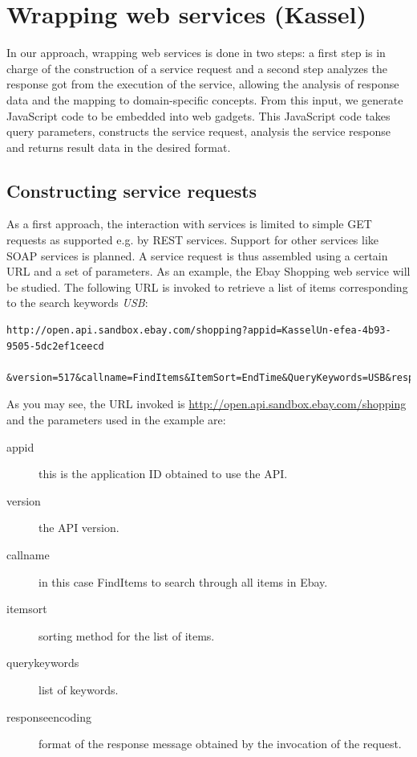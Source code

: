 
\section{Wrapping web services (Kassel)}
\label{sec:wrapping_web_services}

In our approach, wrapping web services is done in two steps: a first step is in charge of the construction of a service request and a second step analyzes the response got from the execution of the service, allowing the analysis of response data and the mapping to domain-specific concepts. From this input, we generate JavaScript code to be embedded into web gadgets. This JavaScript code takes query parameters, constructs the service request, analysis the service response and returns result data in the desired format. 

\subsection{Constructing service requests} %
\label{sub:constructing_service_requests}

As a first approach, the interaction with services is limited to simple GET requests as supported e.g. by REST services. Support for other services like SOAP services is planned. A service request is thus assembled using a certain URL and a set of parameters. As an example, the Ebay Shopping web service will be studied. The following URL is invoked to retrieve a list of items corresponding to the search keywords \emph{USB}:

\begin{listing}
\begin{verbatim}
http://open.api.sandbox.ebay.com/shopping?appid=KasselUn-efea-4b93-9505-5dc2ef1ceecd
  &version=517&callname=FindItems&ItemSort=EndTime&QueryKeywords=USB&responseencoding=XML
\end{verbatim}
\end{listing}

As you may see, the URL invoked is \url{http://open.api.sandbox.ebay.com/shopping} and the parameters used in the example are:
\begin{description}
	\item[appid] this is the application ID obtained to use the API.
	\item[version] the API version.
	\item[callname] in this case FindItems to search through all items in Ebay.
	\item[itemsort] sorting method for the list of items.
	\item[querykeywords] list of keywords.
	\item[responseencoding] format of the response message obtained by the invocation of the request.
\end{description}

